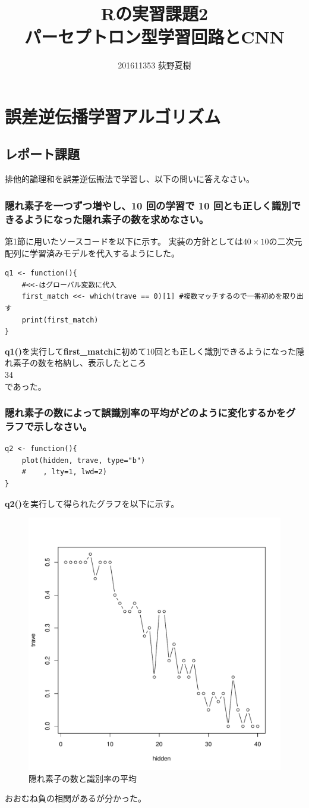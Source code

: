 \documentclass{ltjsarticle}
\title{{\bf Rの実習課題2} \\ パーセプトロン型学習回路とCNN}
\author{201611353 荻野夏樹}
\begin{document}
\maketitle
\section{誤差逆伝播学習アルゴリズム}
\subsection{レポート課題}

排他的論理和を誤差逆伝搬法で学習し、以下の問いに答えなさい。

\subsubsection{隠れ素子を一つずつ増やし、10 回の学習で 10 回とも正しく識別できるようになった隠れ素子の数を求めなさい。}
第1節に用いたソースコードを以下に示す。
実装の方針としては$40 \times 10$の二次元配列に学習済みモデルを代入するようにした。

\begin{lstlisting}
q1 <- function(){
	#<<-はグローバル変数に代入
	first_match <<- which(trave == 0)[1] #複数マッチするので一番初めを取り出す
	print(first_match)
}
\end{lstlisting}
{\bf q1()}を実行して{\bf first\_match}に初めて10回とも正しく識別できるようになった隠れ素子の数を格納し、表示したところ\\
34\\
であった。

\subsubsection{隠れ素子の数によって誤識別率の平均がどのように変化するかをグラフで示しなさい。}
\begin{lstlisting}
q2 <- function(){
	plot(hidden, trave, type="b")
	#	 , lty=1, lwd=2)
}
\end{lstlisting}
{\bf q2()}を実行して得られたグラフを以下に示す。
\begin{figure}[H]
	\centering
	\includegraphics[width=0.5\hsize]{./fig1_2.pdf}
	\caption{隠れ素子の数と識別率の平均}
	\label{fig1_2}
\end{figure}
おおむね負の相関があるが分かった。
\end{document}

